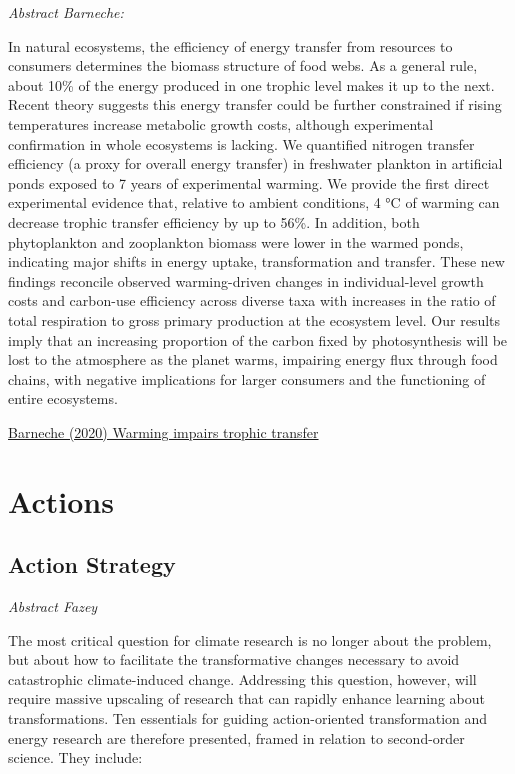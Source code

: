 \documentclass[
]{book}
\begin{document}
\emph{Abstract Barneche:}

In natural ecosystems, the efficiency of energy transfer from resources to consumers
determines the biomass structure of food webs.
As a general rule, about 10\% of the energy produced in one trophic level makes it up to the next.
Recent theory suggests this energy transfer could be further constrained
if rising temperatures increase metabolic growth costs,
although experimental confirmation in whole ecosystems is lacking.
We quantified nitrogen transfer efficiency (a proxy for overall energy transfer)
in freshwater plankton in artificial ponds exposed to 7 years of experimental warming.
We provide the first direct experimental evidence that, relative to ambient conditions,
4 °C of warming can decrease trophic transfer efficiency by up to 56\%.
In addition, both phytoplankton and zooplankton biomass were lower in the warmed ponds,
indicating major shifts in energy uptake, transformation and transfer.
These new findings reconcile observed warming-driven changes in individual-level growth costs
and carbon-use efficiency across diverse taxa
with increases in the ratio of total respiration to gross primary production at the ecosystem level.
Our results imply that an increasing proportion of the carbon fixed by photosynthesis
will be lost to the atmosphere as the planet warms,
impairing energy flux through food chains,
with negative implications for larger consumers and the functioning of entire ecosystems.

\href{https://www.nature.com/articles/s41586-021-03352-2.epdf?sharing_token=en8G_PplC0NZ0bhBexd-sNRgN0jAjWel9jnR3ZoTv0Ocz1xjDcPWe-XYsQ6aAwENGLYkqI0ZtDZNzNTVzQDqzZn-V1IKe1zVtdJyDa_OeTOMHVBxxTmAVAdf8C0XWZFeT5VbXvvLwC4vezF-pqJafKF8PZc0_EjTPOG1MccecjM\%3D}{Barneche (2020) Warming impairs trophic transfer}

\hypertarget{part-actions}{%
\part{Actions}\label{part-actions}}

\hypertarget{action-strategy}{%
\chapter{Action Strategy}\label{action-strategy}}

\emph{Abstract Fazey}

The most critical question for climate research is no longer about the problem,
but about how to facilitate the transformative changes necessary to avoid
catastrophic climate-induced change.
Addressing this question, however, will require massive upscaling of research
that can rapidly enhance learning about transformations.
Ten essentials for guiding action-oriented transformation and energy research are therefore presented,
framed in relation to second-order science.
They include:
\end{document}

